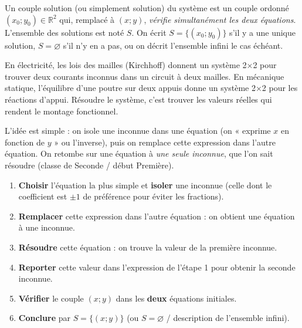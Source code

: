 \documentclass[11pt]{article}
\newcommand{\cle}[1]{{\popxbold\color{popdark}#1}}
\newcounter{popsec}
\newcounter{popsub}
\newcommand{\courssub}[1]{%
  \stepcounter{popsub}%
  \par\vspace{9pt}\noindent{\popxbold\fontsize{11.5}{13}\selectfont\color{popink}{\color{poporange}\thepopsec.\thepopsub}\hspace{6pt}#1}\par\nopagebreak\vspace{4pt}
}
\begin{document}
\begin{definition}
Un \cle{couple solution} (ou simplement \cle{solution}) du système est un couple ordonné $(x_0 ; y_0) \in \mathbb{R}^2$ qui, remplacé à $(x ; y)$, \emph{vérifie simultanément les deux équations}.
L'ensemble des solutions est noté $S$. On écrit $S = \{(x_0 ; y_0)\}$ s'il y a une unique solution, $S = \varnothing$ s'il n'y en a pas, ou on décrit l'ensemble infini le cas échéant.
\end{definition}

\begin{savaistu}
En électricité, les lois des mailles (Kirchhoff) donnent un système 2×2 pour trouver deux courants inconnus dans un circuit à deux mailles. En mécanique statique, l'équilibre d'une poutre sur deux appuis donne un système 2×2 pour les réactions d'appui. Résoudre le système, c'est trouver les valeurs réelles qui rendent le montage fonctionnel.
\end{savaistu}

\courssub{Méthode de substitution}

L'idée est simple : on isole une inconnue dans une équation (on « exprime $x$ en fonction de $y$ » ou l'inverse), puis on remplace cette expression dans l'autre équation. On retombe sur une équation à \emph{une seule inconnue}, que l'on sait résoudre (classe de Seconde / début Première).

\begin{methode}
\begin{enumerate}
\item \textbf{Choisir} l'équation la plus simple et \textbf{isoler} une inconnue (celle dont le coefficient est $\pm 1$ de préférence pour éviter les fractions).
\item \textbf{Remplacer} cette expression dans l'autre équation : on obtient une équation à une inconnue.
\item \textbf{Résoudre} cette équation : on trouve la valeur de la première inconnue.
\item \textbf{Reporter} cette valeur dans l'expression de l'étape 1 pour obtenir la seconde inconnue.
\item \textbf{Vérifier} le couple $(x ; y)$ dans les \textbf{deux} équations initiales.
\item \textbf{Conclure} par $S = \{(x ; y)\}$ (ou $S = \varnothing$ / description de l'ensemble infini).
\end{enumerate}
\end{methode}
\end{document}
